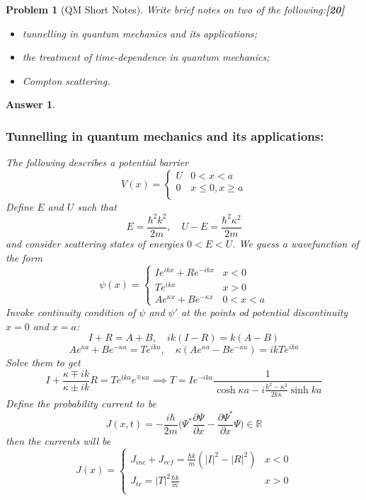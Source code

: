 \documentclass[a4paper]{article}
\newtheorem{ans}{Answer}[subsection]
\theoremstyle{new}
\newtheorem{qns}{Problem}[subsection]
\begin{document}
\newpage
\begin{qns}[QM Short Notes]
Write brief notes on two of the following:\hfill\textbf{[20]}
\begin{itemize}
    \item tunnelling in quantum mechanics and its applications;
    \item the treatment of time-dependence in quantum mechanics;
    \item Compton scattering.
\end{itemize}
\end{qns}
\begin{ans}\leavevmode
\subsubsection*{Tunnelling in quantum mechanics and its applications:}
The following describes a potential barrier
   $$
V(x)=
\left\{
        \begin{array}{ll}
      U & 0<x<a\\
	0& x\leq 0,x\geq a\\
        \end{array}
    \right.
$$
Define $E$ and $U$ such that
$$E=\frac{\hbar^2k^2}{2m},\quad U-E=\frac{\hbar^2\kappa^2}{2m}$$
and consider scattering states of energies $0<E<U$. We guess a wavefunction of the form
       $$
\psi(x)=
\left\{
        \begin{array}{ll}
      Ie^{ikx}+Re^{-ikx} & x<0\\
 Te^{ikx}& x>0\\
 Ae^{\kappa x}+Be^{-\kappa x}&0<x<a
        \end{array}
    \right.
$$
Invoke continuity condition of $\psi$ and $\psi'$ at the points od potential discontinuity $x=0$ and $x=a$:
$$I+R=A+B,\quad ik(I-R)=k(A-B)$$
$$Ae^{\kappa a}+Be^{-\kappa a}=Te^{ika},\quad \kappa (Ae^{\kappa a}-Be^{-\kappa a})=ikTe^{ika}$$
Solve them to get 
$$I+\frac{\kappa\mp ik}{\kappa\pm ik}R=Te^{ika}e^{\mp\kappa a}\implies T=Ie^{-ika}\frac{1}{\cosh\kappa a-i\frac{k^2-\kappa^2}{2k\kappa}\sinh ka}$$
Define the probability current to be
$$J(x,t)=-\frac{i\hbar}{2m}\bigg(\Psi^*\frac{\partial\Psi}{\partial x}-\frac{\partial\Psi^*}{\partial x}\Psi\bigg)\in\mathbb{R}$$
then the currents will be
       $$
J(x)=
\left\{
        \begin{array}{ll}
      J_{inc}+J_{ref}=\frac{\hbar k}{m}(|I|^2-|R|^2)& x<0\\
J_{tr}=|T|^2\frac{\hbar k}{m}& x>0\\
        \end{array}
$$
\end{ans}
\end{document}
